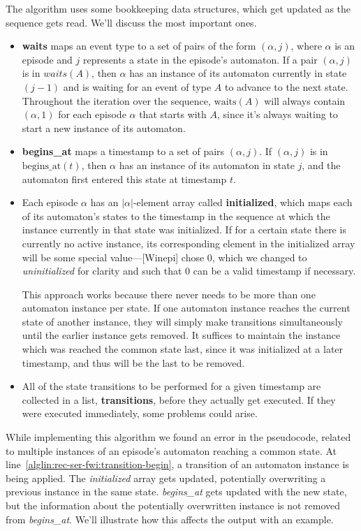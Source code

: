 The algorithm uses some bookkeeping data structures, which get updated as the sequence gets read. We'll discuss the most important ones.
\begin{itemize}
\item \textbf{waits} maps an event type to a set of pairs of the form $ (\alpha, j) $, where $ \alpha $ is an episode and $ j $ represents a state in the episode's automaton. If a pair $ (\alpha, j) $ is in $ waits(A) $, then $ \alpha $ has an instance of its automaton currently in state $ (j - 1) $ and is waiting for an event of type $ A $ to advance to the next state. Throughout the iteration over the sequence, $ \text{waits}(A) $ will always contain $ (\alpha, 1) $ for each episode $ \alpha $ that starts with $ A $, since it's always waiting to start a new instance of its automaton.
\item \textbf{begins\_at} maps a timestamp to a set of pairs $ (\alpha, j) $. If $ (\alpha, j) $ is in $ \text{begins\_at}(t) $, then $ \alpha $ has an instance of its automaton in state $ j $, and the automaton first entered this state at timestamp $ t $.
\item Each episode $ \alpha $ has an $ | \alpha | $-element array called \textbf{initialized}, which maps each of its automaton's states to the timestamp in the sequence at which the instance currently in that state was initialized. If for a certain state there is currently no active instance, its corresponding element in the initialized array will be some special value---[Winepi] chose 0, which we changed to \emph{uninitialized} for clarity and such that 0 can be a valid timestamp if necessary.

This approach works because there never needs to be more than one automaton instance per state. If one automaton instance reaches the current state of another instance, they will simply make transitions simultaneously until the earlier instance gets removed. It suffices to maintain the instance which was reached the common state last, since it was initialized at a later timestamp, and thus will be the last to be removed.
\item All of the state transitions to be performed for a given timestamp are collected in a list, \textbf{transitions}, before they actually get executed. If they were executed immediately, some problems could arise.
\end{itemize}

While implementing this algorithm we found an error in the pseudocode, related to multiple instances of an episode's automaton reaching a common state. At line~\ref{alglin:rec-ser-fwi:transition-begin}, a transition of an automaton instance is being applied. The \emph{initialized} array gets updated, potentially overwriting a previous instance in the same state. \emph{begins\_at} gets updated with the new state, but the information about the potentially overwritten instance is not removed from \emph{begins\_at}. We'll illustrate how this affects the output with an example.

